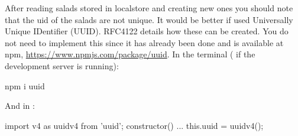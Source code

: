 \documentclass[fleqn, article, a4paper]{memoir}
\begin{document}
\begin{Assignments}
After reading salads stored in localstore and creating new ones you should note that the uid of the salads are not unique. It would be better if  used Universally Unique IDentifier (UUID). RFC4122 details how these can be created. You do not need to implement this since it has already been done and is available at npm, \url{https://www.npmjs.com/package/uuid}. In the terminal ( if the development server is running):
\begin{Code}
npm i uuid
\end{Code}
\noindent And in :
\begin{Code}
import { v4 as uuidv4 } from 'uuid';
constructor(){ 
  ...
  this.uuid = uuidv4();
}
\end{Code}

\end{Assignments}

\end{document}
